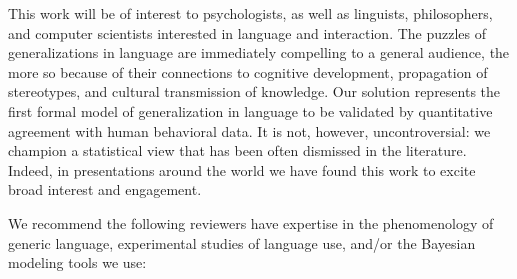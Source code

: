\documentclass[11pt,letterpaper]{letter} %
\begin{document}
\begin{letter}



This work will be of interest to psychologists, as well as linguists, philosophers, and computer scientists interested in language and interaction.
The puzzles of generalizations in language are immediately compelling to a general audience, the more so because of their connections to cognitive development, propagation of stereotypes, and cultural transmission of knowledge.
Our solution represents the first formal model of generalization in language to be validated by quantitative agreement with human behavioral data.
It is not, however, uncontroversial: we champion a statistical view that has been often dismissed in the literature.
Indeed, in presentations around the world we have found this work to excite broad interest and engagement.

We recommend the following reviewers have expertise in the phenomenology of generic language, experimental studies of language use, and/or the Bayesian modeling tools we use:


\end{letter}
\end{document}
